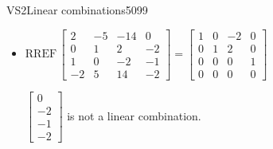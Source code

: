 \begin{exercise}{VS2}{Linear combinations}{5099}
\begin{exerciseAnswer}
\begin{itemize}
 
\item  

 \(
\mathrm{RREF}\, \left[\begin{array}{ccc|c}
2 & -5 & -14 & 0 \\
0 & 1 & 2 & -2 \\
1 & 0 & -2 & -1 \\
-2 & 5 & 14 & -2
\end{array}\right] = \left[\begin{array}{ccc|c}
1 & 0 & -2 & 0 \\
0 & 1 & 2 & 0 \\
0 & 0 & 0 & 1 \\
0 & 0 & 0 & 0
\end{array}\right]
                        \) 

 

 \(\left[\begin{array}{c}
0 \\
-2 \\
-1 \\
-2
\end{array}\right]\) is not a linear combination. 

 
\end{itemize}

     \end{exerciseAnswer}
 \end{exercise}



